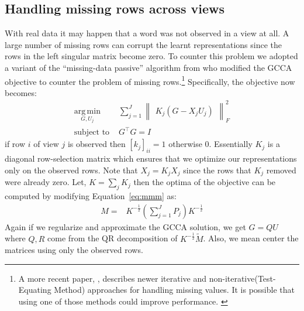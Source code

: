 \documentclass[11pt]{article}
\begin{document}
\subsection{Handling missing rows across views}
\label{ssec:missing}
With real data it may happen that a word was not observed in a view at
all. A large number of 
missing rows can corrupt the learnt representations since the rows
in the left singular matrix become zero.
To counter this problem we adopted a variant of the ``missing-data
passive'' algorithm from \cite{van2006generalized} who modified the
GCCA objective to counter the problem of missing 
rows.\footnote{A more recent paper, \cite{van2012generalized},
  describes newer iterative and non-iterative(Test-Equating Method)
  approaches for handling missing values. It is possible that using
  one of those methods could improve performance. \label{ftn:mis}}
Specifically, the objective now becomes:
\begin{equation}
  \label{eq:gcca2}
\begin{split}
  \operatorname*{arg\,min}_{G,U_j} & \sum_{j=1}^J \begin{Vmatrix} K_j(G - X_jU_j) \end{Vmatrix}^2_F \\
  \text{subject to } & G^\top G = I
\end{split}
\end{equation}
if row $i$ of view $j$ is observed then $[k_j]_{ii} = 1$ otherwise $0$.
Essentially $K_j$ is a diagonal row-selection matrix which ensures
that we optimize our representations only on the observed rows. Note that
$X_j = K_jX_j$ since the rows that $K_j$ removed were already
zero. Let, $K =
\sum_j K_j$ then the optima
of the objective can be computed by modifying Equation~\ref{eq:mmm} as:
\begin{align}
  M =& K^{-\frac{1}{2}}(\sum_{j=1}^J P_j)K^{-\frac{1}{2}}
\end{align}
Again if we regularize and approximate the GCCA solution, we get
$G=QU$ where $Q, R$ come from the QR decomposition of
$K^{-\frac{1}{2}}\tilde{M}$. Also, we mean center the matrices using
only the observed rows.
\end{document}

